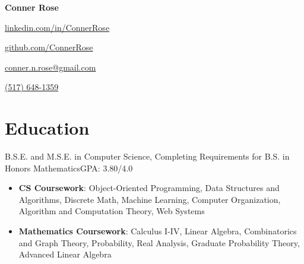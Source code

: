 \documentclass[letterpaper,11pt]{article}
\begin{document}
\begin{center}
    \Huge{\textbf{Conner Rose}} \\
    \begin{itemize*}
        \item[] \href{https://linkedin.com/in/ConnerRose}{linkedin.com/in/ConnerRose}
        \item \href{https://github.com/ConnerRose}{github.com/ConnerRose}
        \item \href{mailto:conner.n.rose@gmail.com}{conner.n.rose@gmail.com}
        \item \href{tel:+15176481359}{(517) 648-1359}
    \end{itemize*}
\end{center}

\section{Education}
{B.S.E. and M.S.E. in Computer Science, Completing Requirements for B.S. in
    Honors Mathematics}{GPA: 3.80/4.0}
\begin{itemize}
    \item \textbf{CS Coursework}: Object-Oriented Programming, Data Structures
          and Algorithms, Discrete Math, Machine Learning, Computer
          Organization, Algorithm and Computation Theory,  Web Systems
    \item \textbf{Mathematics Coursework}: Calculus I-IV, Linear Algebra,
          Combinatorics and Graph Theory, Probability, Real Analysis, Graduate
          Probability Theory, Advanced Linear Algebra
\end{itemize}
\end{document}
